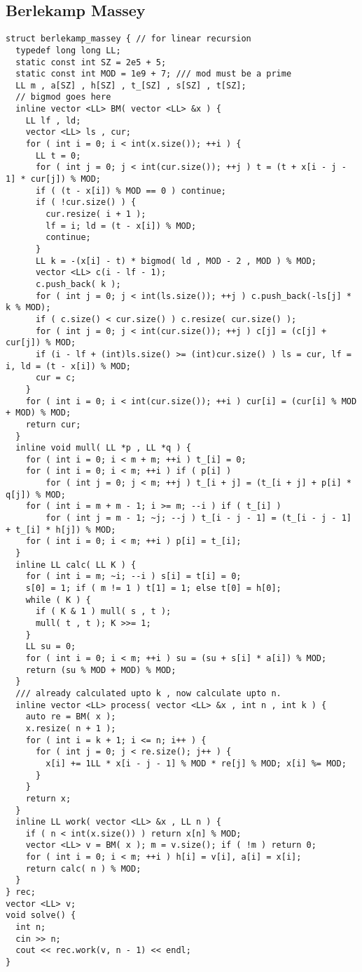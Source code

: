 \documentclass[FSZ,a4paper,onesided]{article}
\begin{document}
\begin{multicols*}{\COLS}
\subsection{Berlekamp Massey}
\begin{lstlisting}
struct berlekamp_massey { // for linear recursion
  typedef long long LL;
  static const int SZ = 2e5 + 5;
  static const int MOD = 1e9 + 7; /// mod must be a prime
  LL m , a[SZ] , h[SZ] , t_[SZ] , s[SZ] , t[SZ];
  // bigmod goes here
  inline vector <LL> BM( vector <LL> &x ) {
    LL lf , ld;
    vector <LL> ls , cur;
    for ( int i = 0; i < int(x.size()); ++i ) {
      LL t = 0;
      for ( int j = 0; j < int(cur.size()); ++j ) t = (t + x[i - j - 1] * cur[j]) % MOD;
      if ( (t - x[i]) % MOD == 0 ) continue;
      if ( !cur.size() ) {
        cur.resize( i + 1 );
        lf = i; ld = (t - x[i]) % MOD;
        continue;
      }
      LL k = -(x[i] - t) * bigmod( ld , MOD - 2 , MOD ) % MOD;
      vector <LL> c(i - lf - 1);
      c.push_back( k );
      for ( int j = 0; j < int(ls.size()); ++j ) c.push_back(-ls[j] * k % MOD);
      if ( c.size() < cur.size() ) c.resize( cur.size() );
      for ( int j = 0; j < int(cur.size()); ++j ) c[j] = (c[j] + cur[j]) % MOD;
      if (i - lf + (int)ls.size() >= (int)cur.size() ) ls = cur, lf = i, ld = (t - x[i]) % MOD;
      cur = c;
    }
    for ( int i = 0; i < int(cur.size()); ++i ) cur[i] = (cur[i] % MOD + MOD) % MOD;
    return cur;
  }
  inline void mull( LL *p , LL *q ) {
    for ( int i = 0; i < m + m; ++i ) t_[i] = 0;
    for ( int i = 0; i < m; ++i ) if ( p[i] )
        for ( int j = 0; j < m; ++j ) t_[i + j] = (t_[i + j] + p[i] * q[j]) % MOD;
    for ( int i = m + m - 1; i >= m; --i ) if ( t_[i] )
        for ( int j = m - 1; ~j; --j ) t_[i - j - 1] = (t_[i - j - 1] + t_[i] * h[j]) % MOD;
    for ( int i = 0; i < m; ++i ) p[i] = t_[i];
  }
  inline LL calc( LL K ) {
    for ( int i = m; ~i; --i ) s[i] = t[i] = 0;
    s[0] = 1; if ( m != 1 ) t[1] = 1; else t[0] = h[0];
    while ( K ) {
      if ( K & 1 ) mull( s , t );
      mull( t , t ); K >>= 1;
    }
    LL su = 0;
    for ( int i = 0; i < m; ++i ) su = (su + s[i] * a[i]) % MOD;
    return (su % MOD + MOD) % MOD;
  }
  /// already calculated upto k , now calculate upto n.
  inline vector <LL> process( vector <LL> &x , int n , int k ) {
    auto re = BM( x );
    x.resize( n + 1 );
    for ( int i = k + 1; i <= n; i++ ) {
      for ( int j = 0; j < re.size(); j++ ) {
        x[i] += 1LL * x[i - j - 1] % MOD * re[j] % MOD; x[i] %= MOD;
      }
    }
    return x;
  }
  inline LL work( vector <LL> &x , LL n ) {
    if ( n < int(x.size()) ) return x[n] % MOD;
    vector <LL> v = BM( x ); m = v.size(); if ( !m ) return 0;
    for ( int i = 0; i < m; ++i ) h[i] = v[i], a[i] = x[i];
    return calc( n ) % MOD;
  }
} rec;
vector <LL> v;
void solve() {
  int n;
  cin >> n;
  cout << rec.work(v, n - 1) << endl;
}


\end{lstlisting}
\end{multicols*}
\end{document}
